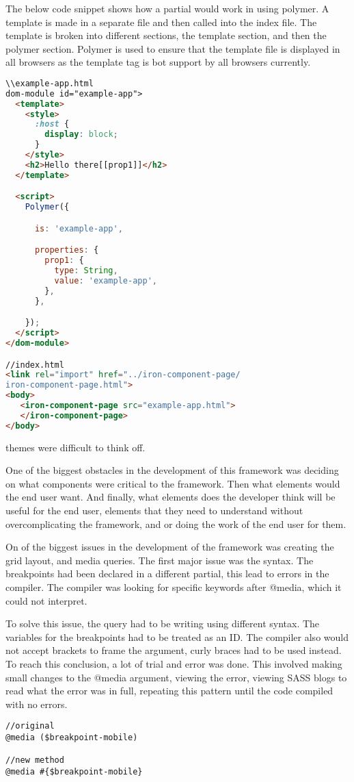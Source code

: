 The below code snippet shows how a partial would work in using polymer. A template is made in a separate file and then called into the index file. The template is broken into different sections, the template section, and then the polymer section. Polymer is used to ensure that the template file is displayed in all browsers as the template tag is bot support by all browsers currently. 

\begin{lstlisting}[language=HTML]
\\example-app.html
dom-module id="example-app">
  <template>
    <style>
      :host {
        display: block;
      }
    </style>
    <h2>Hello there[[prop1]]</h2>
  </template>

  <script>
    Polymer({

      is: 'example-app',

      properties: {
        prop1: {
          type: String,
          value: 'example-app',
        },
      },

    });
  </script>
</dom-module>

//index.html
<link rel="import" href="../iron-component-page/
iron-component-page.html">
<body>
   <iron-component-page src="example-app.html">
   </iron-component-page>
</body>
\end{lstlisting}

themes were difficult to think off. 

One of the biggest obstacles in the development of this framework was deciding on what components were critical to the framework. Then what elements would the end user want. And finally, what elements does the developer think will be useful for the end user, elements that they need to understand without overcomplicating the framework, and or doing the work of the end user for them.

On of the biggest issues in the development of the framework was creating the grid layout, and media queries. The first major issue was the syntax. The breakpoints had been declared in a different partial, this lead to errors in the compiler. The compiler was looking for specific keywords after @media, which it could not interpret.

To solve this issue, the query had to be writing using different syntax. The variables for the breakpoints had to be treated as an ID. The compiler also would not accept brackets to frame the argument, curly braces had to be used instead. To reach this conclusion, a lot of trial and error was done. This involved making small changes to the @media argument, viewing  the error, viewing \gls{SASS} blogs to read what the error was in full, repeating this pattern until the code compiled with no errors. 
\begin{lstlisting}[language=CSS3]
//original 
@media ($breakpoint-mobile)

//new method
@media #{$breakpoint-mobile} 
\end{lstlisting}

